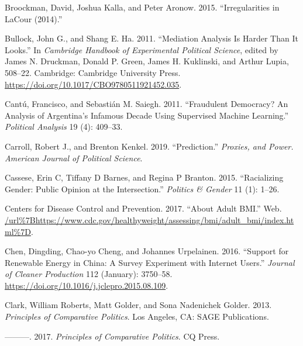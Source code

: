 \documentclass{book}
\newlength{\cslhangindent}
\newlength{\cslentryspacingunit} %
\newenvironment{CSLReferences}[2] %
 {%
  \setlength{\parindent}{0pt}
  \ifodd #1
  \let\oldpar\par
  \def\par{\hangindent=\cslhangindent\oldpar}
  \fi
  \setlength{\parskip}{#2\cslentryspacingunit}
 }%
 {}
\begin{document}
\begin{CSLReferences}{1}{0}
\leavevmode{}%
Broockman, David, Joshua Kalla, and Peter Aronow. 2015. {``Irregularities in
{LaCour} (2014).''}

\leavevmode{}%
Bullock, John G., and Shang E. Ha. 2011. {``Mediation {Analysis Is Harder Than
It Looks}.''} In \emph{Cambridge {Handbook} of {Experimental Political
Science}}, edited by James N. Druckman, Donald P. Green, James H. Kuklinski,
and Arthur Lupia, 508--22. {Cambridge}: {Cambridge University Press}.
\url{https://doi.org/10.1017/CBO9780511921452.035}.

\leavevmode{}%
Cantú, Francisco, and Sebastián M. Saiegh. 2011. {``Fraudulent Democracy? An
Analysis of Argentina's Infamous Decade Using Supervised Machine Learning.''}
\emph{\emph{Political Analysis}} 19 (4): 409--33.

\leavevmode{}%
Carroll, Robert J., and Brenton Kenkel. 2019. {``Prediction.''} \emph{Proxies,
and Power. \emph{American Journal of Political Science}}.

\leavevmode{}%
Cassese, Erin C, Tiffany D Barnes, and Regina P Branton. 2015. {``Racializing
Gender: Public Opinion at the Intersection.''} \emph{Politics \& Gender} 11
(1): 1--26.

\leavevmode{}%
Centers for Disease Control and Prevention. 2017. {``About Adult {BMI}.''}
Web.
\url{/url\%7Bhttps://www.cdc.gov/healthyweight/assessing/bmi/adult_bmi/index.html\%7D}.

\leavevmode{}%
Chen, Dingding, Chao-yo Cheng, and Johannes Urpelainen. 2016. {``Support for
Renewable Energy in {China}: A Survey Experiment with Internet Users.''}
\emph{Journal of Cleaner Production} 112 (January): 3750--58.
\url{https://doi.org/10.1016/j.jclepro.2015.08.109}.

\leavevmode{}%
Clark, William Roberts, Matt Golder, and Sona Nadenichek Golder. 2013.
\emph{Principles of {Comparative Politics}}. {Los Angeles, CA}: {SAGE
Publications}.

\leavevmode{}%
---------. 2017. \emph{Principles of Comparative Politics}. CQ Press.


\end{CSLReferences}
\end{document}

